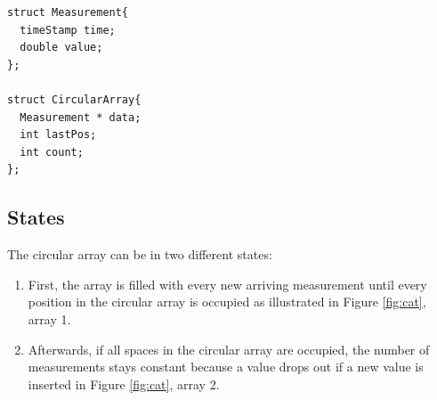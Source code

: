\documentclass[abstracton,12pt,oneside]{scrreprt}
\begin{document}
\lstset{language=C}
\begin{lstlisting}
struct Measurement{
  timeStamp time;
  double value;
};

struct CircularArray{
  Measurement * data;
  int lastPos;
  int count;
};
\end{lstlisting}
\BlankLine

\subsection{States}
The circular array can be in two different states:
\begin{enumerate}  
	\item First, the array is filled with every new arriving measurement until every position in the circular array is occupied as illustrated in Figure \ref{fig:cat}, array 1.  
	\item Afterwards, if all spaces in the circular array are occupied, the number of measurements stays constant because a value drops out if a new value is inserted in Figure \ref{fig:cat}, array 2. 
\end{enumerate}
\end{document}
